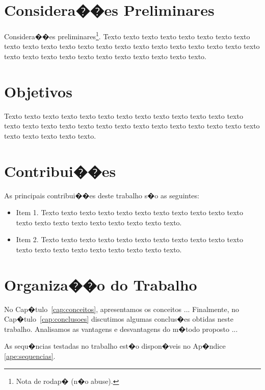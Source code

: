 


\section{Considera��es Preliminares}
\label{sec:consideracoes_preliminares}

Considera��es preliminares\footnote{Nota de rodap� (n�o abuse).}.
Texto texto texto texto texto texto texto texto texto texto texto texto texto
texto texto texto texto texto texto texto texto texto texto texto texto texto
texto texto texto texto texto texto texto.
 

\section{Objetivos}
\label{sec:objetivo}

Texto texto texto texto texto texto texto texto texto texto texto texto texto
texto texto texto texto texto texto texto texto texto texto texto texto texto
texto texto texto texto texto texto.

\section{Contribui��es}
\label{sec:contribucoes}

As principais contribui��es deste trabalho s�o as seguintes:

\begin{itemize}
  \item Item 1. Texto texto texto texto texto texto texto texto texto texto
  texto texto texto texto texto texto texto texto texto texto.

  \item Item 2. Texto texto texto texto texto texto texto texto texto texto
  texto texto texto texto texto texto texto texto texto texto.

\end{itemize}

\section{Organiza��o do Trabalho}
\label{sec:organizacao_trabalho}

No Cap�tulo~\ref{cap:conceitos}, apresentamos os conceitos ... Finalmente, no
Cap�tulo~\ref{cap:conclusoes} discutimos algumas conclus�es obtidas neste
trabalho. Analisamos as vantagens e desvantagens do m�todo proposto ... 

As sequ�ncias testadas no trabalho est�o dispon�veis no Ap�ndice \ref{ape:sequencias}.
